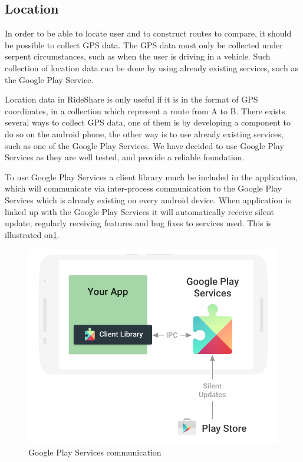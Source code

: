 \subsection{Location}
In order to be able to locate user and to construct routes to compare, it should be possible to collect GPS data. The GPS data must only be collected under serpent circumstances, such as when the user is driving in a vehicle. Such collection of location data can be done by using already existing services, such as the Google Play Service.

Location data in RideShare is only useful if it is in the format of GPS coordinates, in a collection which represent a route from A to B.
There exists several ways to collect GPS data, one of them is by developing a component to do so on the android phone, the other way is to use already existing services, such as one of the Google Play Services.
We have decided to use Google Play Services as they are well tested, and provide a reliable foundation.

To use Google Play Services a client library much be included in the application, which will communicate via inter-process communication to the Google Play Services which is already existing on every android device. When application is linked up with the Google Play Services it will automatically receive silent update, regularly receiving features and bug fixes to services used. This is illustrated on\ref{fig:gapifigure}\cite{GapiOverview}.

\begin{figure}[h]
	\centering
	\includegraphics[width=\textwidth]{figures/play-services-diagram.png}
	\caption{Google Play Services communication\cite{GapiFigure}}
	\label{fig:gapifigure}
\end{figure}

